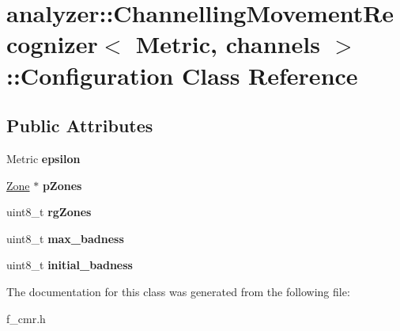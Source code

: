 \hypertarget{classanalyzer_1_1_channelling_movement_recognizer_1_1_configuration}{}\section{analyzer\+::Channelling\+Movement\+Recognizer$<$ Metric, channels $>$\+::Configuration Class Reference}
\label{classanalyzer_1_1_channelling_movement_recognizer_1_1_configuration}
\subsection*{Public Attributes}
\begin{DoxyCompactItemize}
\item 
\mbox{\label{classanalyzer_1_1_channelling_movement_recognizer_1_1_configuration_aa1208e5a59089f13ac184cf8192b2271}} 
Metric {\bfseries epsilon}
\item 
\mbox{\label{classanalyzer_1_1_channelling_movement_recognizer_1_1_configuration_a85c61a3de972f946bd580a9a51c5ba16}} 
\mbox{\hyperlink{structanalyzer_1_1_channelling_movement_recognizer_1_1_zone}{Zone}} $\ast$ {\bfseries p\+Zones}
\item 
\mbox{\label{classanalyzer_1_1_channelling_movement_recognizer_1_1_configuration_a8f87139bba39c550375a8591b85c1ca2}} 
uint8\+\_\+t {\bfseries rg\+Zones}
\item 
\mbox{\label{classanalyzer_1_1_channelling_movement_recognizer_1_1_configuration_a3a2c5b90e463cde4fca040ea5caf6555}} 
uint8\+\_\+t {\bfseries max\+\_\+badness}
\item 
\mbox{\label{classanalyzer_1_1_channelling_movement_recognizer_1_1_configuration_ab3052a1c5b998d8f95f549d2f76d6648}} 
uint8\+\_\+t {\bfseries initial\+\_\+badness}
\end{DoxyCompactItemize}


The documentation for this class was generated from the following file\+:\begin{DoxyCompactItemize}
\item 
f\+\_\+cmr.\+h\end{DoxyCompactItemize}

